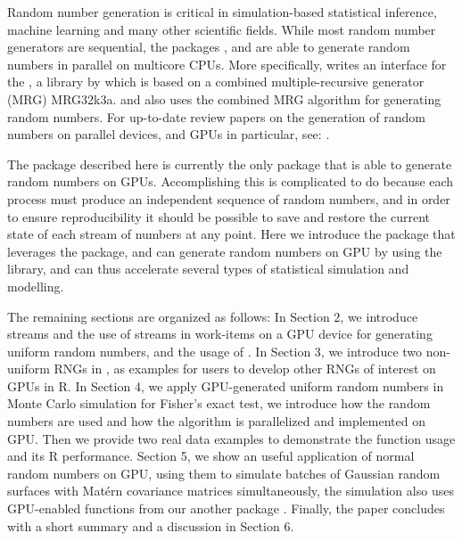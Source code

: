 \documentclass[article,nojss]{jss}\usepackage[]{graphicx}\usepackage[]{color}
\newcommand{\fct}[1]{\code{#1()}}
\begin{document}
\begin{leftbar}
Random number generation is critical in simulation-based statistical inference, machine learning and many other scientific fields. While most random number generators are sequential, the  packages ,  \citep*{future1.19.1} and  \citep{sevcikova2015package} are able to generate random numbers in parallel on multicore CPUs. More specifically,  writes an interface for the , a  library by \cite{l2002object} which is based on a combined multiple-recursive generator (MRG) MRG32k3a.  and  also uses the combined MRG algorithm for generating random numbers. For up-to-date review papers on the generation of random numbers on parallel devices, and GPUs in particular, see:  \cite{rLEC15a,rLEC17p,rLEC21a}.


The  package described here is currently the only  package that is able to generate random numbers on GPUs. Accomplishing this is complicated to do because each process must produce an independent sequence of random numbers, and in order to ensure reproducibility it should be possible to save and restore the current state of each stream of numbers at any point.  Here we introduce the  package  that leverages the  package, and can generate random numbers on GPU by using the  \citep{l2015clrng} library, and can thus accelerate several types of statistical simulation and modelling.



The remaining sections are organized as follows:
In Section 2, we introduce streams and the use of streams in work-items on a GPU device for generating uniform random numbers, and the usage of \fct{clrng::runif}.
In Section 3, we introduce two non-uniform RNGs in , as examples for users to develop other RNGs of interest on GPUs in R.
In Section 4, we apply GPU-generated uniform random numbers in Monte Carlo simulation for Fisher’s exact test, we introduce how the random numbers are used and how the algorithm is parallelized and implemented on GPU. Then we provide two real data examples to demonstrate the function usage and its R performance.
Section 5, we show an useful application of normal random numbers on GPU, using them to simulate batches of Gaussian random surfaces with Mat\'ern covariance matrices simultaneously, the simulation also uses GPU-enabled functions from our another package .
Finally, the paper concludes with a short summary and a discussion in Section 6.



\end{leftbar}
\end{document}
